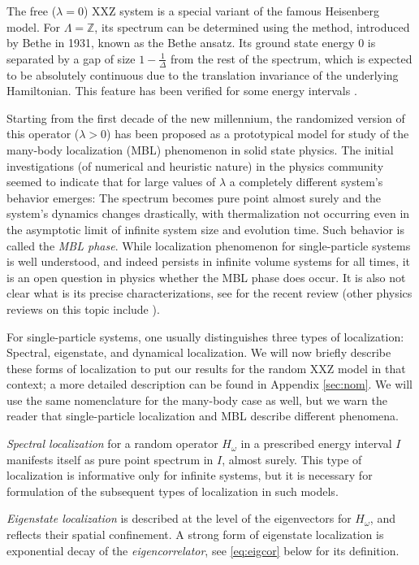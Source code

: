 \documentclass[12pt, a4paper,reqno]{amsart}
\numberwithin{equation}{section}
\newcommand\Z{\mathbb Z}
\newcommand\La{\Lambda}
\newcommand{\fd}{1- \frac{1}{\Delta}}
\begin{document}
The free ($\lambda=0$) XXZ system is a special variant of  the famous Heisenberg model. For $\La=\Z$, its  spectrum can be determined using the method, introduced by Bethe in 1931,  known as the Bethe ansatz.
 Its ground state energy $0$ is separated by a gap of size  $\fd$ from the rest of the spectrum, which is expected to be absolutely continuous due to the translation invariance of the underlying Hamiltonian. This feature has been verified for some energy intervals \cite{NaSpSt,FiSt}.

 Starting from the first decade of the new millennium, the randomized version of this operator ($\lambda>0$) has been proposed as a prototypical model for study of the many-body localization (MBL) phenomenon  in solid state physics.  The initial investigations (of numerical and heuristic nature) in the physics community seemed to indicate that for large values of $\lambda$  a completely different system's behavior emerges: The spectrum becomes pure point almost surely and  the system's dynamics changes drastically, 
with thermalization not occurring even in the asymptotic limit of infinite system size and evolution time. Such behavior is called the {\it MBL phase}. While localization phenomenon for single-particle systems is well understood, and indeed persists in infinite volume systems for all times, it is an open question in physics whether the MBL phase does occur. It is also not clear what is its precise characterizations, see \cite{sierant2024} for the recent review (other physics reviews on this topic include \cite{NandHuse,AL,abanin2019}).

  For single-particle systems, one usually distinguishes three types of localization: Spectral, eigenstate, and dynamical localization. We will now briefly describe these forms of localization to put our results for the random XXZ model in that context; a more detailed description can be found in Appendix \ref{sec:nom}. We will use the same nomenclature for the many-body case as well, but we warn the reader that  single-particle localization and MBL describe different phenomena.
 
 {\it Spectral localization}  for a random operator $H_\omega$ in a prescribed energy interval $I$ manifests itself as pure point spectrum in  $I$, almost surely. 
 This type of localization is informative only for infinite systems, but it is necessary for formulation of the subsequent types of localization in such models.

{\it Eigenstate localization} is described at the level of the eigenvectors for $H_\omega$, and reflects their spatial confinement. A strong form of eigenstate localization is exponential decay of the {\it eigencorrelator}, see \eqref{eq:eigcor} below for its definition.
\end{document}
